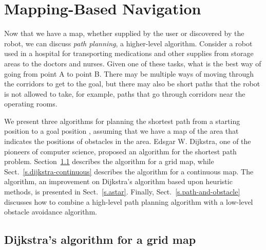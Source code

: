 
\chapter{Mapping-Based Navigation}\label{ch.map-based}


Now that we have a map, whether supplied by the user or discovered by the robot, we can discuss \emph{path planning}, a higher-level algorithm. Consider a robot used in a hospital for transporting medications and other supplies from storage areas to the doctors and nurses. Given one of these tasks, what is the best way of going from point A to point B. There may be multiple ways of moving through the corridors to get to the goal, but there may also be short paths that the robot is not allowed to take, for example, paths that go through corridors near the operating rooms.

We present three algorithms for planning the shortest path from a starting position  to a goal position , assuming that we have a map of the area that indicates the positions of obstacles in the area. Edsgar W. Dijkstra, one of the pioneers of computer science, proposed an algorithm for the shortest path problem. Section~\ref{s.dijkstra-grid} describes the algorithm for a grid map, while Sect.~\ref{s.dijkstra-continuous} describes the algorithm for a continuous map. The \astar{} algorithm, an improvement on Dijkstra's algorithm based upon heuristic methods, is presented in Sect.~\ref{s.astar}. Finally, Sect.~\ref{s.path-and-obstacle} discusses how to combine a high-level path planning algorithm with a low-level obstacle avoidance algorithm.

\section{Dijkstra's algorithm for a grid map}\label{s.dijkstra-grid}

